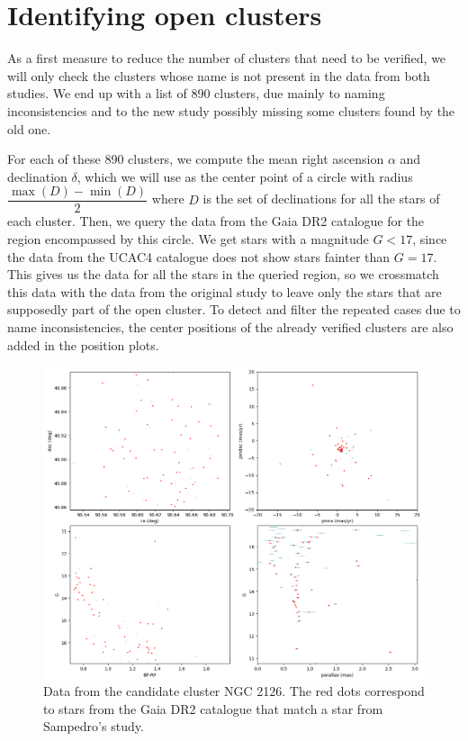 \documentclass[twocolumn]{revtex4}
\begin{document}
\section{Identifying open clusters}

As a first measure to reduce the number of clusters that need to be verified, we will only check the clusters whose name is not present in the data from both studies. We end up with a list of 890 clusters, due mainly to naming inconsistencies and to the new study possibly missing some clusters found by the old one.

For each of these 890 clusters, we compute the mean right ascension $\alpha$ and declination $\delta$, which we will use as the center point of a circle with radius $\dfrac{\max(D) - \min(D)}{2}$ where $D$ is the set of declinations for all the stars of each cluster. Then, we query the data from the Gaia DR2 catalogue for the region encompassed by this circle. We get stars with a magnitude $G < 17$, since the data from the UCAC4 catalogue does not show stars fainter than $G = 17$. This gives us the data for all the stars in the queried region, so we crossmatch this data with the data from the original study to leave only the stars that are supposedly part of the open cluster. To detect and filter the repeated cases due to name inconsistencies, the center positions of the already verified clusters are also added in the position plots.

\begin{figure}
\centering
\includegraphics[scale=0.5]{NGC_2126_crossmatch}
\caption{Data from the candidate cluster NGC 2126. The red dots correspond to stars from the Gaia DR2 catalogue that match a star from Sampedro's study.}
\label{crossmatched_data}
\end{figure}
\end{document}

